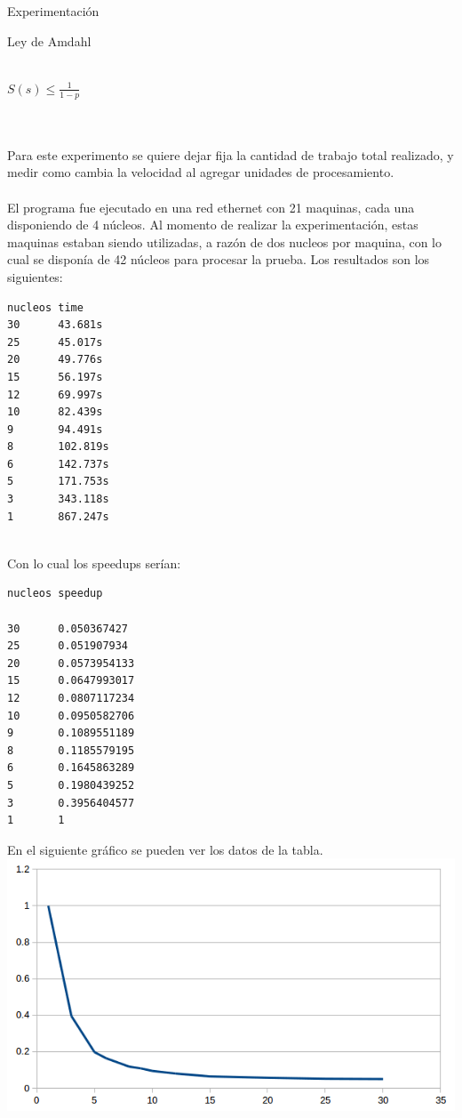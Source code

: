 \begin{section}{Experimentación}
\begin{subsection}{Ley de Amdahl}
~\\
~\\
\begin{center}
$S(s) \leq  \frac{1}{1-p}$
\end{center}
~\\
~\\
\newpage
Para este experimento se quiere dejar fija la cantidad de trabajo total realizado, y medir como cambia la velocidad al agregar unidades de procesamiento. 
~\\
~\\
El programa fue ejecutado en una red ethernet con 21 maquinas, cada una disponiendo de 4 núcleos. Al momento de realizar la experimentación, estas maquinas estaban siendo utilizadas, a razón de dos nucleos por maquina, con lo cual se disponía de 42 núcleos para procesar la prueba. Los resultados son los siguientes:
~\\
\begin{verbatim}
nucleos time
30      43.681s
25      45.017s
20      49.776s
15      56.197s
12      69.997s
10      82.439s
9       94.491s
8       102.819s
6       142.737s
5       171.753s
3       343.118s
1       867.247s
\end{verbatim}
~\\
Con lo cual los speedups serían:
~\\
\begin{verbatim}
nucleos speedup

30      0.050367427
25      0.051907934
20      0.0573954133
15      0.0647993017
12      0.0807117234
10      0.0950582706
9       0.1089551189
8       0.1185579195
6       0.1645863289
5       0.1980439252
3       0.3956404577
1       1
\end{verbatim}

En el siguiente gráfico se pueden ver los datos de la tabla.
~\\
\includegraphics{AmdahlSpeedup}


\end{subsection}
\end{section}
